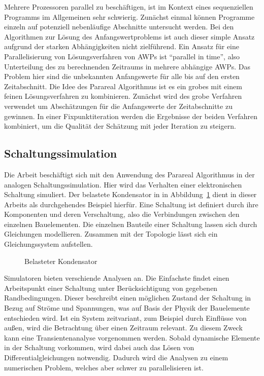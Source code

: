 Mehrere Prozessoren parallel zu beschäftigen, ist im Kontext eines sequenziellen Programms im Allgemeinen sehr schwierig. Zunächst einmal können Programme einzeln auf potenziell nebenläufige Abschnitte untersucht werden. Bei den Algorithmen zur Lösung des Anfangswertproblems ist auch dieser simple Ansatz aufgrund der starken Abhängigkeiten nicht zielführend. Ein Ansatz für eine Parallelisierung von Lösungsverfahren von AWPs ist "`parallel in time"', also Unterteilung des zu berechnenden Zeitraums in mehrere abhängige AWPs. Das Problem hier sind die unbekannten Anfangswerte für alle bis auf den ersten Zeitabschnitt. Die Idee des Parareal Algorithmus ist es ein grobes mit einem feinen Lösungsverfahren zu kombinieren. Zunächst wird des grobe Verfahren verwendet um Abschätzungen für die Anfangswerte der Zeitabschnitte zu gewinnen. In einer Fixpunktiteration werden die Ergebnisse der beiden Verfahren kombiniert, um die Qualität der Schätzung mit jeder Iteration zu steigern.
\subsection*{Schaltungssimulation}
Die Arbeit beschäftigt sich mit den Anwendung des Parareal Algorithmus in der analogen Schaltungssimulation. Hier wird das Verhalten einer elektronischen Schaltung simuliert. Der belastete Kondensator in in Abbildung~\ref{fig:cap} dient in dieser Arbeits als durchgehendes Beispiel hierfür. Eine Schaltung ist definiert durch ihre Komponenten und deren Verschaltung, also die Verbindungen zwischen den einzelnen Bauelementen. Die einzelnen Bauteile einer Schaltung lassen sich durch Gleichungen modellieren. Zusammen mit der Topologie lässt sich ein Gleichungssystem aufstellen.\\

\begin{figure}[ht]
    \centering
        \begin{circuitikz}[scale=1.0]
            
        \end{circuitikz}
    \caption{Belasteter Kondensator}
\label{fig:cap}
\end{figure}

Simulatoren bieten verschiende Analysen an. Die Einfachste findet einen Arbeitspunkt einer Schaltung unter Berücksichtigung von gegebenen Randbedingungen. Dieser beschreibt einen möglichen Zustand der Schaltung in Bezug auf Ströme und Spannungen, was auf Basis der Physik der Bauelemente entschieden wird. Ist ein System zeitvariant, zum Beispiel durch Einflüsse von außen, wird die Betrachtung über einen Zeitraum relevant. Zu diesem Zweck kann eine Transientenanalyse vorgenommen werden. Sobald dynamische Elemente in der Schaltung vorkommen, wird dabei auch das Lösen von Differentialgleichungen notwendig. Dadurch wird die Analysen zu einem numerischen Problem, welches aber schwer zu parallelisieren ist.\\

